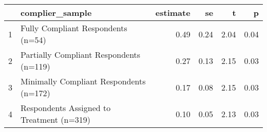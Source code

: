 \begin{table}[ht]
\centering
\begin{tabular}{rlrrrr}
  \hline
 & complier\_sample & estimate & se & t & p \\ 
  \hline
1 & Fully Compliant Respondents (n=54) & 0.49 & 0.24 & 2.04 & 0.04 \\ 
  2 & Partially Compliant Respondents (n=119) & 0.27 & 0.13 & 2.15 & 0.03 \\ 
  3 & Minimally Compliant Respondents (n=172) & 0.17 & 0.08 & 2.15 & 0.03 \\ 
  4 & Respondents Assigned to Treatment (n=319) & 0.10 & 0.05 & 2.13 & 0.03 \\ 
   \hline
\end{tabular}
\end{table}
